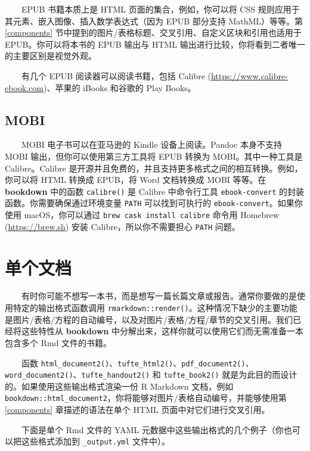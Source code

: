 \documentclass[
  12pt,
]{krantz}
\theoremstyle{definition}
\theoremstyle{definition}
\theoremstyle{definition}
\theoremstyle{definition}
\theoremstyle{remark}
\begin{document}
  EPUB 书籍本质上是 HTML 页面的集合，例如，你可以将 CSS 规则应用于其元素、嵌入图像、插入数学表达式（因为 EPUB 部分支持 MathML）等等。第 \ref{components} 节中提到的图片/表格标题、交叉引用、自定义区块和引用也适用于 EPUB。你可以将本书的 EPUB 输出与 HTML 输出进行比较，你将看到二者唯一的主要区别是视觉外观。

  有几个 EPUB 阅读器可以阅读书籍，包括 Calibre (\url{https://www.calibre-ebook.com})、苹果的 iBooks 和谷歌的 Play Books。

\hypertarget{mobi}{%
\subsection{MOBI}\label{mobi}}

  MOBI 电子书可以在亚马逊的 Kindle 设备上阅读。Pandoc 本身不支持 MOBI 输出，但你可以使用第三方工具将 EPUB 转换为 MOBI。其中一种工具是 Calibre。Calibre 是开源并且免费的，并且支持更多格式之间的相互转换。例如，你可以将 HTML 转换成 EPUB，将 Word 文档转换成 MOBI 等等。在 \textbf{bookdown} 中的函数 \texttt{calibre()} 是 Calibre 中命令行工具 \texttt{ebook-convert} 的封装函数。你需要确保通过环境变量 \texttt{PATH} 可以找到可执行的 \texttt{ebook-convert}。如果你使用 macOS，你可以通过 \texttt{brew\ cask\ install\ calibre} 命令用 Homebrew (\url{https://brew.sh}) 安装 Calibre，所以你不需要担心 \texttt{PATH} 问题。

\hypertarget{a-single-document}{%
\section{单个文档}\label{a-single-document}}

  有时你可能不想写一本书，而是想写一篇长篇文章或报告。通常你要做的是使用特定的输出格式函数调用 \texttt{rmarkdown::render()}。这种情况下缺少的主要功能是图片/表格/方程的自动编号，以及对图片/表格/方程/章节的交叉引用。我们已经将这些特性从 \textbf{bookdown} 中分解出来，这样你就可以使用它们而无需准备一本包含多个 Rmd 文件的书籍。

  函数 \texttt{html\_document2()}、\texttt{tufte\_html2()}、\texttt{pdf\_document2()}、\texttt{word\_document2()}、\texttt{tufte\_handout2()} 和 \texttt{tufte\_book2()} 就是为此目的而设计的。如果使用这些输出格式渲染一份 R Markdown 文档，例如 \texttt{bookdown::html\_document2}，你将能够对图片/表格自动编号，并能够使用第 \ref{components} 章描述的语法在单个 HTML 页面中对它们进行交叉引用。

  下面是单个 Rmd 文件的 YAML 元数据中这些输出格式的几个例子（你也可以把这些格式添加到 \texttt{\_output.yml} 文件中）。
\end{document}
